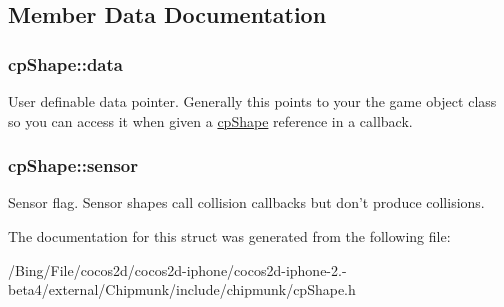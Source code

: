 \subsection{Member Data Documentation}
\hypertarget{structcp_shape_a25736bb8b57bfd8b73a364b503a47f68}{
\subsubsection[{data}]{ {\bf cp\-Shape\-::data}}}\label{structcp_shape_a25736bb8b57bfd8b73a364b503a47f68}
User definable data pointer. Generally this points to your the game object class so you can access it when given a \hyperlink{structcp_shape}{cp\-Shape} reference in a callback. \hypertarget{structcp_shape_a313e68986b75440efbce418429ad11e3}{
\subsubsection[{sensor}]{ {\bf cp\-Shape\-::sensor}}}\label{structcp_shape_a313e68986b75440efbce418429ad11e3}
Sensor flag. Sensor shapes call collision callbacks but don't produce collisions. 

The documentation for this struct was generated from the following file\-:\begin{DoxyCompactItemize}
\item 
/\-Bing/\-File/cocos2d/cocos2d-\/iphone/cocos2d-\/iphone-\/2.-\/beta4/external/\-Chipmunk/include/chipmunk/cp\-Shape.\-h\end{DoxyCompactItemize}
